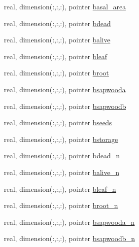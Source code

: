 \begin{DoxyCompactItemize}
\item 
real, dimension(\+:,\+:,\+:), pointer \hyperlink{structed__state__vars_1_1edtype_a7f7ef1c8840302bb077a47d2a101ecf4}{basal\+\_\+area}
\item 
real, dimension(\+:,\+:,\+:), pointer \hyperlink{structed__state__vars_1_1edtype_ad4fcd5b227e4eee12d74af0daf132561}{bdead}
\item 
real, dimension(\+:,\+:,\+:), pointer \hyperlink{structed__state__vars_1_1edtype_a3bb8f9f97d580d2917cd0203edd0b56d}{balive}
\item 
real, dimension(\+:,\+:,\+:), pointer \hyperlink{structed__state__vars_1_1edtype_a3a276de064b0dc7263aefa8e728d9c95}{bleaf}
\item 
real, dimension(\+:,\+:,\+:), pointer \hyperlink{structed__state__vars_1_1edtype_aed796e8ec3b7aaf11d72d7abad50ee10}{broot}
\item 
real, dimension(\+:,\+:,\+:), pointer \hyperlink{structed__state__vars_1_1edtype_a533a9bdb7408a11b87cbeefb3fa7b457}{bsapwooda}
\item 
real, dimension(\+:,\+:,\+:), pointer \hyperlink{structed__state__vars_1_1edtype_a617c8eafa90489182af4a835c19c9ddc}{bsapwoodb}
\item 
real, dimension(\+:,\+:,\+:), pointer \hyperlink{structed__state__vars_1_1edtype_a24c896b774b8c586a0caab64cd2e9f90}{bseeds}
\item 
real, dimension(\+:,\+:,\+:), pointer \hyperlink{structed__state__vars_1_1edtype_acf4e43578b1107c62263a39bffd858e2}{bstorage}
\item 
real, dimension(\+:,\+:,\+:), pointer \hyperlink{structed__state__vars_1_1edtype_aea9330612f16053ec3d717a091265c0e}{bdead\+\_\+n}
\item 
real, dimension(\+:,\+:,\+:), pointer \hyperlink{structed__state__vars_1_1edtype_acd0df113357dfc0216d463e64c744968}{balive\+\_\+n}
\item 
real, dimension(\+:,\+:,\+:), pointer \hyperlink{structed__state__vars_1_1edtype_a9631e22ecc01eda46b23f3e392dcf5b9}{bleaf\+\_\+n}
\item 
real, dimension(\+:,\+:,\+:), pointer \hyperlink{structed__state__vars_1_1edtype_ad1591cea5906a745c8fbe2fe6d0bae18}{broot\+\_\+n}
\item 
real, dimension(\+:,\+:,\+:), pointer \hyperlink{structed__state__vars_1_1edtype_a9c627911bc9738677587cb69b4c4efb3}{bsapwooda\+\_\+n}
\item 
real, dimension(\+:,\+:,\+:), pointer \hyperlink{structed__state__vars_1_1edtype_a8db3f05f1867f06a447001bb6bd3b77c}{bsapwoodb\+\_\+n}

\end{DoxyCompactItemize}
